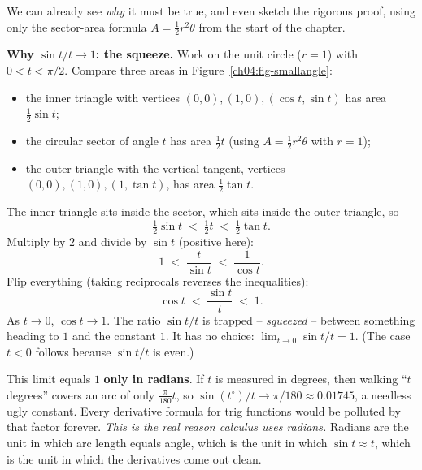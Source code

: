 We can already see \emph{why} it must be true, and even sketch the rigorous proof, using only the sector-area formula $A = \tfrac12 r^2\theta$ from the start of the chapter.

\begin{focusbox}
\textbf{Why $\sin t / t \to 1$: the squeeze.} Work on the unit circle ($r=1$) with $0 < t < \pi/2$. Compare three areas in Figure~\ref{ch04:fig-smallangle}:
\begin{itemize}
  \item the inner triangle with vertices $(0,0),(1,0),(\cos t,\sin t)$ has area $\tfrac12\sin t$;
  \item the circular sector of angle $t$ has area $\tfrac12 t$ (using $A=\tfrac12 r^2\theta$ with $r=1$);
  \item the outer triangle with the vertical tangent, vertices $(0,0),(1,0),(1,\tan t)$, has area $\tfrac12\tan t$.
\end{itemize}
The inner triangle sits inside the sector, which sits inside the outer triangle, so
\[
  \tfrac12 \sin t \;<\; \tfrac12 t \;<\; \tfrac12 \tan t.
\]
Multiply by $2$ and divide by $\sin t$ (positive here):
\[
  1 \;<\; \frac{t}{\sin t} \;<\; \frac{1}{\cos t}.
\]
Flip everything (taking reciprocals reverses the inequalities):
\[
  \cos t \;<\; \frac{\sin t}{t} \;<\; 1.
\]
As $t\to 0$, $\cos t \to 1$. The ratio $\sin t/t$ is trapped -- \emph{squeezed} -- between something heading to $1$ and the constant $1$. It has no choice: $\lim_{t\to 0}\sin t/t = 1$. (The case $t<0$ follows because $\sin t/t$ is even.)
\end{focusbox}

\begin{trapbox}
This limit equals $1$ \textbf{only in radians}. If $t$ is measured in degrees, then walking ``$t$ degrees'' covers an arc of only $\tfrac{\pi}{180}t$, so $\sin(t^\circ)/t \to \pi/180 \approx 0.01745$, a needless ugly constant. Every derivative formula for trig functions would be polluted by that factor forever. \emph{This is the real reason calculus uses radians.} Radians are the unit in which arc length equals angle, which is the unit in which $\sin t \approx t$, which is the unit in which the derivatives come out clean.
\end{trapbox}

